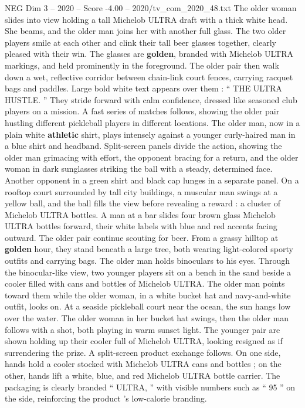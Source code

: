 \begin{textsample}{NEG Dim 3 – 2020 – Score -4.00 – 2020/tv\_com\_2020\_48.txt}
The older woman slides into view holding a tall Michelob ULTRA draft with a thick white head.
She beams, and the older man joins her with another full glass.
The two older players smile at each other and clink their tall beer glasses together, clearly pleased with their win.
The glasses are \textbf{golden}, branded with Michelob ULTRA markings, and held prominently in the foreground.
The older pair then walk down a wet, reflective corridor between chain-link court fences, carrying racquet bags and paddles.
Large bold white text appears over them : “ THE ULTRA HUSTLE. ” They stride forward with calm confidence, dressed like seasoned club players on a mission.
A fast series of matches follows, showing the older pair hustling different pickleball players in different locations.
The older man, now in a plain white \textbf{athletic} shirt, plays intensely against a younger curly-haired man in a blue shirt and headband.
Split-screen panels divide the action, showing the older man grimacing with effort, the opponent bracing for a return, and the older woman in dark sunglasses striking the ball with a steady, determined face.
Another opponent in a green shirt and black cap lunges in a separate panel.
On a rooftop court surrounded by tall city buildings, a muscular man swings at a yellow ball, and the ball fills the view before revealing a reward : a cluster of Michelob ULTRA bottles.
A man at a bar slides four brown glass Michelob ULTRA bottles forward, their white labels with blue and red accents facing outward.
The older pair continue scouting for beer.
From a grassy hilltop at \textbf{golden} hour, they stand beneath a large tree, both wearing light-colored sporty outfits and carrying bags.
The older man holds binoculars to his eyes.
Through the binocular-like view, two younger players sit on a bench in the sand beside a cooler filled with cans and bottles of Michelob ULTRA.
The older man points toward them while the older woman, in a white bucket hat and navy-and-white outfit, looks on.
At a seaside pickleball court near the ocean, the sun hangs low over the water.
The older woman in her bucket hat swings, then the older man follows with a shot, both playing in warm sunset light.
The younger pair are shown holding up their cooler full of Michelob ULTRA, looking resigned as if surrendering the prize.
A split-screen product exchange follows.
On one side, hands hold a cooler stocked with Michelob ULTRA cans and bottles ; on the other, hands lift a white, blue, and red Michelob ULTRA bottle carrier.
The packaging is clearly branded “ ULTRA, ” with visible numbers such as “ 95 ” on the side, reinforcing the product ’s low-calorie branding.

\end{textsample}

